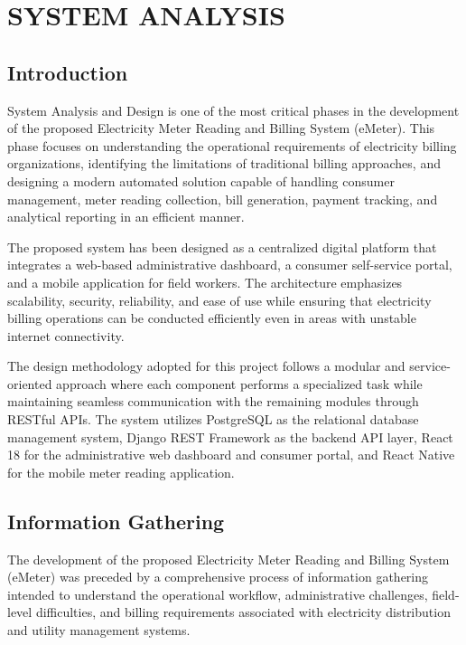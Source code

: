 \documentclass[12pt, a4paper, onecolumn]{report}
\begin{document}
\chapter{SYSTEM ANALYSIS}

\section{Introduction}

System Analysis and Design is one of the most critical phases in the development of the proposed Electricity Meter Reading and Billing System (eMeter). This phase focuses on understanding the operational requirements of electricity billing organizations, identifying the limitations of traditional billing approaches, and designing a modern automated solution capable of handling consumer management, meter reading collection, bill generation, payment tracking, and analytical reporting in an efficient manner.

The proposed system has been designed as a centralized digital platform that integrates a web-based administrative dashboard, a consumer self-service portal, and a mobile application for field workers. The architecture emphasizes scalability, security, reliability, and ease of use while ensuring that electricity billing operations can be conducted efficiently even in areas with unstable internet connectivity.

The design methodology adopted for this project follows a modular and service-oriented approach where each component performs a specialized task while maintaining seamless communication with the remaining modules through RESTful APIs. The system utilizes PostgreSQL as the relational database management system, Django REST Framework as the backend API layer, React 18 for the administrative web dashboard and consumer portal, and React Native for the mobile meter reading application.

\section{Information Gathering}

The development of the proposed Electricity Meter Reading and Billing System (eMeter) was preceded by a comprehensive process of information gathering intended to understand the operational workflow, administrative challenges, field-level difficulties, and billing requirements associated with electricity distribution and utility management systems.
\end{document}
